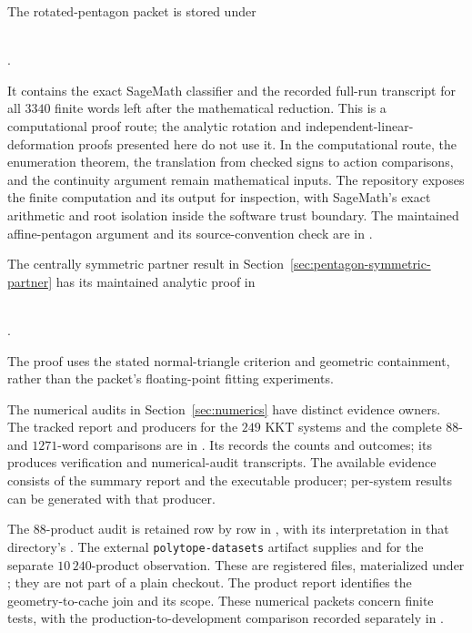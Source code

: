 The rotated-pentagon packet is stored under
\begin{center}
  \small{}\\[-0.2em]
  .
\end{center}
It contains the exact SageMath classifier and the recorded full-run transcript
for all \(3340\) finite words left after the mathematical reduction.  This is a computational proof route; the analytic rotation and
independent-linear-deformation proofs presented here do not use it. In the
computational route, the enumeration theorem, the
translation from checked signs to action comparisons, and the continuity
argument remain mathematical inputs.  The repository exposes the finite
computation and its output for inspection, with SageMath's exact arithmetic
and root isolation inside the software trust boundary. The maintained
affine-pentagon argument and its source-convention check are in
.

The centrally symmetric partner result in
Section~\ref{sec:pentagon-symmetric-partner} has its maintained analytic proof in
\begin{center}
  \small{}\\[-0.2em]
  .
\end{center}
The proof uses the stated normal-triangle criterion and geometric containment,
rather than the packet's floating-point fitting experiments.

The numerical audits in Section~\ref{sec:numerics} have distinct evidence owners.
The tracked report and producers for the \(249\) KKT systems and the complete
\(88\)- and \(1271\)-word comparisons are in
.
Its  records the counts and outcomes; its 
produces verification and numerical-audit transcripts. The available evidence
consists of the summary report and the executable producer; per-system results
can be generated with that producer.

\begin{sloppypar}
The \(88\)-product audit is retained row by row in
,
with its interpretation in that directory's .
The external \texttt{polytope-datasets} artifact supplies
 and  for the separate
\(10\,240\)-product observation. These are registered files,
materialized under ; they are not part
of a plain checkout. The product report identifies the
geometry-to-cache join and its scope. These numerical packets concern finite
tests, with the production-to-development comparison recorded separately in
.
\end{sloppypar}

